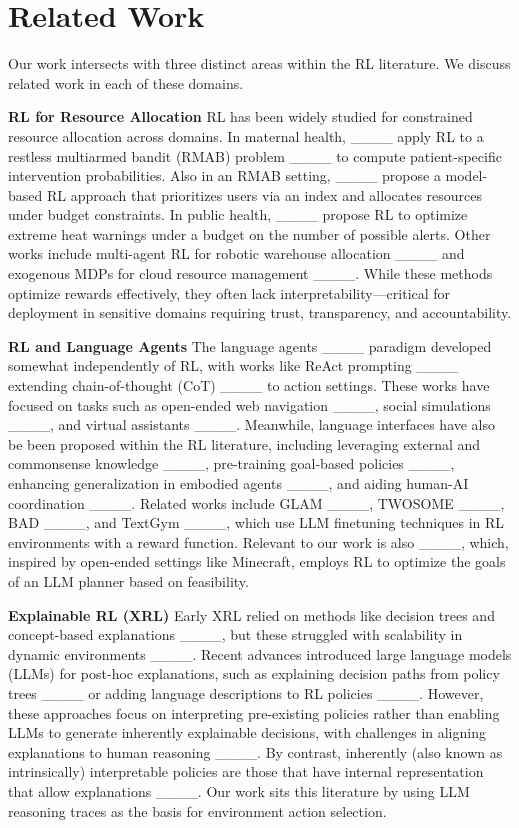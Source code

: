 \section{Related Work}
\label{sec:related}

Our work intersects with three distinct areas within the RL literature. We discuss related work in each of these domains.


\textbf{RL for Resource Allocation}\quad
RL has been widely studied for constrained resource allocation across domains. In maternal health, ____ apply RL to a restless multiarmed bandit (RMAB) problem ____ to compute patient-specific intervention probabilities. Also in an RMAB setting, ____ propose a model-based RL approach that prioritizes users via an index and allocates resources under budget constraints. In public health, ____ propose RL to optimize  extreme heat warnings under a budget on the number of possible alerts. Other works include multi-agent RL for robotic warehouse allocation ____ and exogenous MDPs for cloud resource management ____. While these methods optimize rewards effectively, they often lack interpretability---critical for deployment in sensitive domains requiring trust, transparency, and accountability.


\textbf{RL and Language Agents}\quad 
The language agents ____ paradigm developed somewhat independently of RL, with works like ReAct prompting ____ extending chain-of-thought (CoT) ____ to action settings. These works have focused on tasks such as open-ended web navigation ____, social simulations ____, and virtual assistants ____. Meanwhile, language interfaces have also be been proposed within the RL literature, including leveraging external and commonsense knowledge ____, pre-training goal-based policies ____, enhancing generalization in embodied agents ____, and aiding human-AI coordination ____. Related works include GLAM ____, TWOSOME ____, BAD ____, and TextGym ____, which use LLM finetuning techniques in RL environments with a reward function. Relevant to our work is also ____, which, inspired by open-ended settings like Minecraft, employs RL to optimize the goals of an LLM planner based on feasibility.



\textbf{Explainable RL (XRL)}\quad
Early XRL relied on methods like decision trees and concept-based explanations ____, but these struggled with scalability in dynamic environments ____. Recent advances introduced large language models (LLMs) for post-hoc explanations, such as explaining decision paths from policy trees ____ or adding language descriptions to RL policies ____. However, these approaches focus on interpreting pre-existing policies rather than enabling LLMs to generate inherently explainable decisions, with challenges in aligning explanations to human reasoning ____. By contrast, inherently (also known as intrinsically) interpretable policies  are those that have internal representation that allow explanations 
 ____. Our work sits this literature by using LLM reasoning traces as the basis for environment action selection.
 
